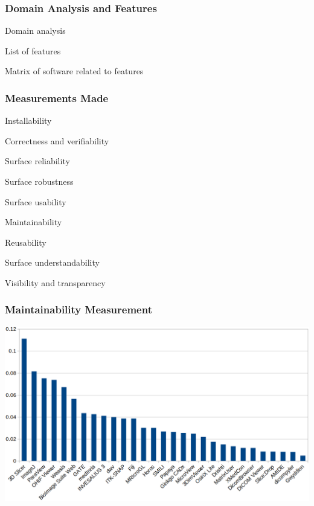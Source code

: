 \documentclass[t,12pt,numbers,fleqn]{beamer}
\begin{document}

\begin{frame}
\frametitle{Domain Analysis and Features}

\bi
\item {}
  \bi
\item Domain analysis
\item List of features
\item Matrix of software related to features \ei \ei

\end{frame}


\begin{frame}
\frametitle{Measurements Made}

\be
\item Installability
\item Correctness and verifiability
\item Surface reliability
\item Surface robustness
\item Surface usability
\item Maintainability
\item Reusability
\item Surface understandability
\item Visibility and transparency
 \ee
  
\end{frame}


\begin{frame}
\frametitle{Maintainability Measurement}

\bigskip

\includegraphics[width=1.0\textwidth]{maintainability_scores.png}


\end{frame}
\end{document}
